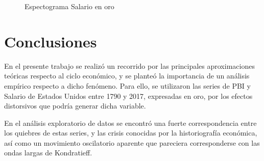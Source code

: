 \documentclass[a4paper]{article}
\begin{document}
\begin{figure}[H]
	\centering
	\caption{Espectograma Salario en oro} \label{fig:espect_wg}
\end{figure}



\section{Conclusiones}

En el presente trabajo se realizó un recorrido por las principales aproximaciones teóricas respecto al ciclo económico, y se planteó la importancia de un análisis empírico respecto a dicho fenómeno. Para ello, se utilizaron las series de PBI y Salario de Estados Unidos entre 1790 y 2017, expresadas en oro, por los efectos distorsivos que podría generar dicha variable. 

En el análisis exploratorio de datos se encontró una fuerte correspondencia entre los quiebres de estas series, y las crisis conocidas por la historiografía económica, así como un movimiento oscilatorio aparente que pareciera corresponderse con las ondas largas de Kondratieff.
\end{document}
